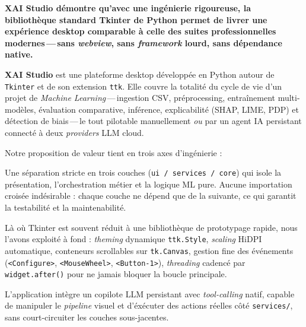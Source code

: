 \documentclass[11pt,a4paper]{report}
\begin{document}
\begin{pitchbox}
\sffamily\large\color{primary}
\textbf{XAI Studio d\'emontre qu'avec une ing\'enierie rigoureuse, la
biblioth\`eque standard Tkinter de Python permet de livrer une
exp\'erience desktop comparable \`a celle des suites professionnelles
modernes\,---\,sans \textit{webview}, sans \textit{framework} lourd,
sans d\'ependance native.}
\end{pitchbox}

\textbf{XAI Studio} est une plateforme desktop d\'evelopp\'ee en
Python autour de \texttt{Tkinter} et de son extension \texttt{ttk}.
Elle couvre la totalit\'e du cycle de vie d'un projet de
\textit{Machine Learning}\,---\,ingestion CSV, pr\'eprocessing,
entra\^inement multi-mod\`eles, \'evaluation comparative, inf\'erence,
explicabilit\'e (SHAP, LIME, PDP) et d\'etection de biais\,---\,le
tout pilotable manuellement \textit{ou} par un agent IA persistant
connect\'e \`a deux \textit{providers} LLM cloud.

Notre proposition de valeur tient en trois axes d'ing\'enierie :

\begin{description}[font=\sffamily\bfseries\color{accent}]
    \item[Maturit\'e architecturale]
        Une s\'eparation stricte en trois couches
        (\texttt{ui / services / core}) qui isole la pr\'esentation, l'orchestration
        m\'etier et la logique ML pure. Aucune importation crois\'ee
        ind\'esirable : chaque couche ne d\'epend que de la
        suivante, ce qui garantit la testabilit\'e et la maintenabilit\'e.

    \item[Tkinter port\'e \`a un niveau professionnel]
        L\`a o\`u Tkinter est souvent r\'eduit \`a une biblioth\`eque
        de prototypage rapide, nous l'avons exploit\'e \`a fond :
        \textit{theming} dynamique \texttt{ttk.Style}, \textit{scaling}
        HiDPI automatique, conteneurs scrollables sur
        \texttt{tk.Canvas}, gestion fine des \'ev\'enements
        (\texttt{<Configure>}, \texttt{<MouseWheel>},
        \texttt{<Button-1>}), \textit{threading} cadenc\'e par
        \texttt{widget.after()} pour ne jamais bloquer la boucle
        principale.

    \item[Agent IA comme couche d'orchestration]
        L'application int\`egre un copilote LLM persistant avec
        \textit{tool-calling} natif, capable de manipuler le
        \textit{pipeline} visuel et d'\'ex\'ecuter des actions r\'eelles
        c\^ot\'e \texttt{services/}, sans court-circuiter les couches
        sous-jacentes.
\end{description}
\end{document}
